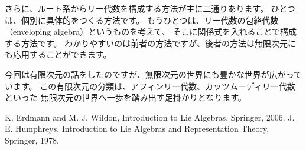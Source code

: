 \documentclass{ltjsarticle}
\begin{document}
さらに、ルート系からリー代数を構成する方法が主に二通りあります。
ひとつは、個別に具体的をつくる方法です。
もうひとつは、リー代数の包絡代数（enveloping algebra）というものを考えて、
そこに関係式を入れることで構成する方法です。
わかりやすいのは前者の方法ですが、後者の方法は無限次元にも応用することができます。

今回は有限次元の話をしたのですが、無限次元の世界にも豊かな世界が広がっています。
この有限次元の分類は、アフィンリー代数、カッツムーディリー代数といった
無限次元の世界へ一歩を踏み出す足掛かりとなります。

\begin{thebibliography}{9}
     K. Erdmann and M. J. Wildon, Introduction to Lie Algebras, Springer, 2006.
     J. E. Humphreys, Introduction to Lie Algebras and Representation Theory, Springer, 1978.
\end{thebibliography}
\end{document}
